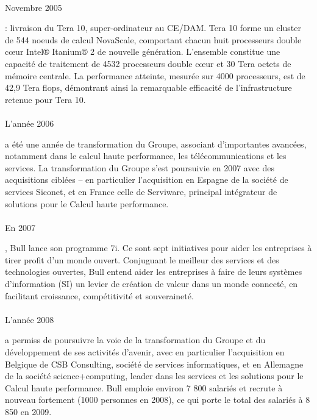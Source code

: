 \documentclass[11pt]{article}
\begin{document}
		\paragraph{}
		\begin{bf}Novembre 2005\end{bf} : livraison du Tera 10, super-ordinateur au CE/DAM. Tera 10 forme un cluster de 
		544 noeuds de calcul NovaScale, comportant chacun huit processeurs double cœur Intel® Itanium® 2 de nouvelle 
		génération. L'ensemble constitue une capacité de traitement de 4532 processeurs double cœur et 30 Tera octets de 
		mémoire centrale. La performance atteinte, mesurée sur 4000 processeurs, est de 42,9 Tera flops, démontrant ainsi la 
		remarquable efficacité de l’infrastructure retenue pour Tera 10.
		\paragraph{}
		\begin{bf}L’année 2006\end{bf} a été une année de transformation du Groupe, associant d’importantes avancées, 
		notamment dans le calcul haute performance, les télécommunications et les services.
		La transformation du Groupe s’est poursuivie en 2007 avec des acquisitions ciblées – en particulier l’acquisition 
		en Espagne de la société de services Siconet, et en France celle de Serviware, principal intégrateur de solutions pour 
		le Calcul haute performance.
		\paragraph{}
		\begin{bf}En 2007\end{bf}, Bull lance son programme 7i. Ce sont sept initiatives pour aider les entreprises à 
		tirer profit d’un monde ouvert. Conjuguant le meilleur des services et des technologies ouvertes, Bull entend aider 
		les entreprises à faire de leurs systèmes d’information (SI) un levier de création de valeur dans un monde connecté, 
		en facilitant croissance, compétitivité et souveraineté.
		\paragraph{}
		\begin{bf}L’année 2008\end{bf} a permiss de poursuivre la voie de la transformation du Groupe et du développement de 
		ses activités d’avenir, avec en particulier l’acquisition en Belgique de CSB Consulting, société de services 
		informatiques, et en Allemagne de la société science+computing, leader dans les services et les solutions pour le 
		Calcul haute performance.
		Bull emploie environ 7 800 salariés et recrute à nouveau fortement (1000 personnes en 2008), ce qui porte le total des 
		salariés à 8 850 en 2009.
\end{document}
